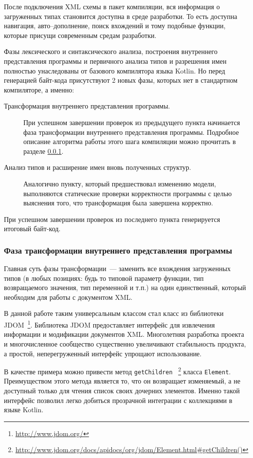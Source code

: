 После подключения XML схемы в пакет компиляции, вся информация о загруженных типах становится доступна в среде разработки. То есть доступна навигация, авто--дополнение, поиск вхождений и тому подобные функции, которые присущи современным средам разработки.

Фазы лексического и синтаксического анализа, построения внутреннего представления программы и первичного анализа типов и разрешения имен полностью унаследованы от базового компилятора языка Kotlin. Но перед генерацией байт-кода присутствуют 2 новых фазы, которых нет в стандартном компиляторе, а именно:

\begin{description}
\item[Трансформация внутреннего представления программы.] При успешном завершении проверок из предыдущего пункта начинается фаза трансформации внутреннего представления программы. Подробное описание алгоритма работы этого шага компиляции можно прочитать в разделе \ref{xml-tranformation-phase}.
\item[Анализ типов и расширение имен вновь полученных структур.]
Аналогично пункту, который предшествовал изменению модели, выполняются статические проверки корректности программы с целью выяснения того, что трансформация была завершена корректно. 
\end{description}

При успешном завершении проверок из последнего пункта генерируется итоговый байт-код.
  
\subsubsection{Фаза трансформации внутреннего представления программы}\label{xml-tranformation-phase}
Главная суть фазы трансформации~--- заменить все вхождения загруженных типов (в любых позициях: будь то типовой параметр функции, тип возвращаемого значения, тип переменной и т.п.) на один единственный, который необходим для работы с документом XML.

В данной работе таким универсальным классом стал класс  из библиотеки JDOM~\footnote{\url{http://www.jdom.org/}}. Библиотека JDOM предоставляет интерфейс для извлечения информации и модификации документов XML. Многолетняя разработка проекта и многочисленное сообщество существенно увеличивают стабильность продукта, а простой, неперегруженный интерфейс упрощают использование.

В качестве примера можно привести метод \texttt{getChildren} ~\footnote{\url{http://www.jdom.org/docs/apidocs/org/jdom/Element.html\#getChildren()}} класса \texttt{Element}.
Преимуществом этого метода является то, что он возвращает изменяемый, а не доступный только для чтения список своих дочерних элементов. Именно такой интерфейс позволил легко добиться прозрачной интеграции с коллекциями в языке Kotlin.

